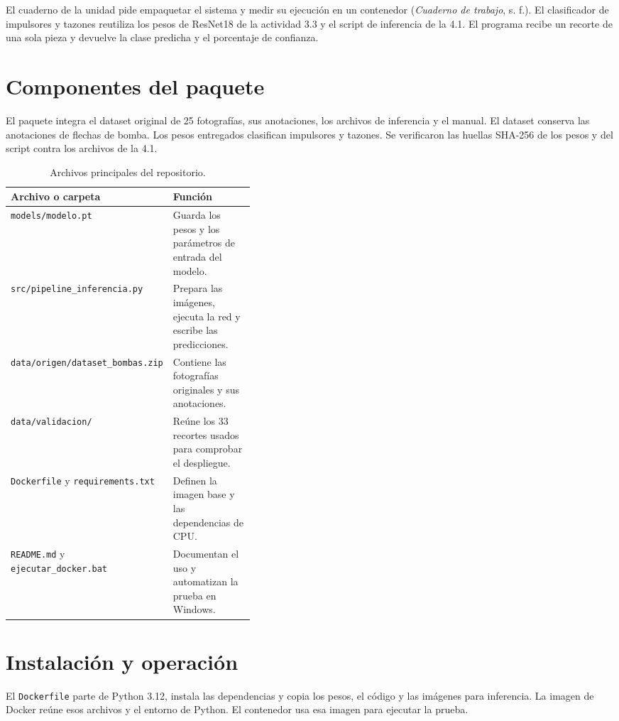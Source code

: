 \documentclass[11pt,letterpaper]{article}
\begin{document}
El cuaderno de la unidad pide empaquetar el sistema y medir su ejecución en un contenedor (\textit{Cuaderno de trabajo}, s. f.). El clasificador de impulsores y tazones reutiliza los pesos de ResNet18 de la actividad 3.3 y el script de inferencia de la 4.1. El programa recibe un recorte de una sola pieza y devuelve la clase predicha y el porcentaje de confianza.

\section*{Componentes del paquete}

El paquete integra el dataset original de 25 fotografías, sus anotaciones, los archivos de inferencia y el manual. El dataset conserva las anotaciones de flechas de bomba. Los pesos entregados clasifican impulsores y tazones. Se verificaron las huellas SHA-256 de los pesos y del script contra los archivos de la 4.1.

\begin{table}[htbp]
\centering
\small
\caption{Archivos principales del repositorio.}
\begin{tabularx}{\linewidth}{@{}>{\raggedright\arraybackslash}p{0.40\linewidth}X@{}}
\toprule
\textbf{Archivo o carpeta} & \textbf{Función} \\
\midrule
\texttt{models/modelo.pt} & Guarda los pesos y los parámetros de entrada del modelo. \\
\texttt{src/pipeline\_inferencia.py} & Prepara las imágenes, ejecuta la red y escribe las predicciones. \\
\texttt{data/origen/dataset\_bombas.zip} & Contiene las fotografías originales y sus anotaciones. \\
\texttt{data/validacion/} & Reúne los 33 recortes usados para comprobar el despliegue. \\
\texttt{Dockerfile} y \texttt{requirements.txt} & Definen la imagen base y las dependencias de CPU. \\
\texttt{README.md} y \texttt{ejecutar\_docker.bat} & Documentan el uso y automatizan la prueba en Windows. \\
\bottomrule
\end{tabularx}
\end{table}

\section*{Instalación y operación}

El \texttt{Dockerfile} parte de Python 3.12, instala las dependencias y copia los pesos, el código y las imágenes para inferencia. La imagen de Docker reúne esos archivos y el entorno de Python. El contenedor usa esa imagen para ejecutar la prueba.
\end{document}
